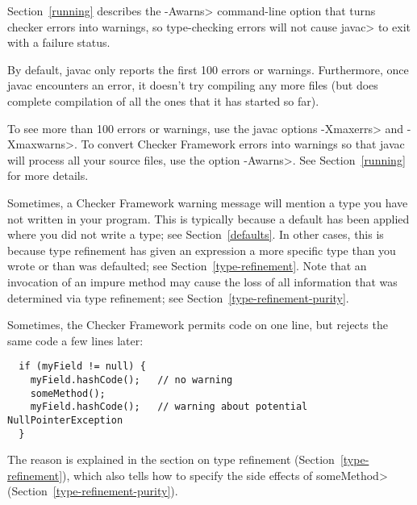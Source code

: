
Section~\ref{running} describes the \<-Awarns> command-line
option that turns checker errors into warnings, so type-checking errors
will not cause \<javac> to exit with a failure status.



By default, javac only reports the first 100 errors or warnings.
Furthermore, once javac encounters an error, it doesn't try compiling any
more files (but does complete compilation of all the ones that it has
started so far).

To see more than 100 errors or warnings, use the javac options \<-Xmaxerrs>
and \<-Xmaxwarns>.  To convert Checker Framework errors into warnings so
that javac will process all your source files, use the option \<-Awarns>.
See Section~\ref{running} for more details.



Sometimes, a Checker Framework warning message will mention a type you have
not written in your program.  This is typically because a default has been
applied where you did not write a type; see Section~\ref{defaults}.  In
other cases, this is because type refinement has given an
expression a more specific type than you wrote or than was defaulted; see
Section~\ref{type-refinement}.
Note that an invocation of an impure method may cause the loss of all
information that was determined via type refinement; see
Section~\ref{type-refinement-purity}.



Sometimes, the Checker Framework permits code on one line, but rejects the
same code a few lines later:

\begin{Verbatim}
  if (myField != null) {
    myField.hashCode();   // no warning
    someMethod();
    myField.hashCode();   // warning about potential NullPointerException
  }
\end{Verbatim}

The reason is explained in the section on type refinement
(Section~\ref{type-refinement}), which also tells how to specify the side
effects of \<someMethod> (Section~\ref{type-refinement-purity}).


